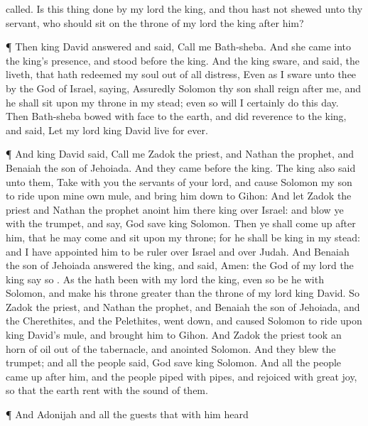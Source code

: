 {called.
Is this
thing
done by my
lord the
king, and thou hast not
shewed
{} unto thy
servant, who should
sit on the
throne of my
lord the
king
after him?
\par }{\PP {}¶ Then
king
David
answered and
said,
Call me
Bath-sheba. And she
came into the
king’s
presence, and
stood
before the
king.
And the
king
sware, and
said,
{} the
{}
liveth, that hath
redeemed my
soul out of all
distress,
Even as I
sware unto thee by the
{}
God of
Israel,
saying, Assuredly
Solomon thy
son shall
reign
after me, and he shall
sit upon my
throne in my stead; even so will I certainly
do this
day.
Then
Bath-sheba
bowed with
{}
face to the
earth, and did
reverence to the
king, and
said, Let my
lord
king
David
live for
ever.
\par }{\PP {}¶ And
king
David
said,
Call me
Zadok the
priest, and
Nathan the
prophet, and
Benaiah the
son of
Jehoiada. And they
came
before the
king.
The
king also
said unto them,
Take with you the
servants of your
lord, and cause
Solomon my
son to
ride upon mine own
mule, and bring him
down to
Gihon:
And let
Zadok the
priest and
Nathan the
prophet
anoint him there
king over
Israel: and
blow ye with the
trumpet, and
say, God
save
king
Solomon.
Then ye shall come
up
after him, that he may
come and
sit upon my
throne; for he shall be
king in my stead: and I have
appointed him to be
ruler over
Israel and over
Judah.
And
Benaiah the
son of
Jehoiada
answered the
king, and
said,
Amen: the
{}
God of my
lord the
king
say so
{}.
As the
{} hath been with my
lord the
king, even so be he with
Solomon, and
make his
throne
greater than the
throne of my
lord
king
David.
So
Zadok the
priest, and
Nathan the
prophet, and
Benaiah the
son of
Jehoiada, and the
Cherethites, and the
Pelethites, went
down, and caused
Solomon to
ride upon
king
David’s
mule, and
brought him to
Gihon.
And
Zadok the
priest
took an
horn of
oil out of the
tabernacle, and
anointed
Solomon. And they
blew the
trumpet; and all the
people
said, God
save
king
Solomon.
And all the
people came
up
after him, and the
people
piped with
pipes, and
rejoiced with
great
joy, so that the
earth
rent with the
sound of them.
\par }{\PP {}¶ And
Adonijah and all the
guests that
{} with him
heard
}

